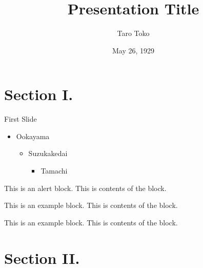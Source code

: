 \documentclass[dvipdfmx,unicode,10pt]{beamer}
\title{Presentation Title}
\author{Taro Toko}
\institute{Tokyo Institute of Technology}
\date{May 26, 1929}
\begin{document}
\begin{frame}
  \maketitle
\end{frame}

\section{Section I.}

\begin{frame}{First Slide}
  \begin{itemize}
  \item Ookayama
    \begin{itemize}
    \item Suzukakedai
      \begin{itemize}
      \item Tamachi
      \end{itemize}
    \end{itemize}
  \end{itemize}

  \begin{alertblock}{This is an alert block.}
    This is contents of the block.
  \end{alertblock}

  \begin{exampleblock}{This is an example block.}
    This is contents of the block.
  \end{exampleblock}

  \begin{block}{This is an example block.}
    This is contents of the block.
  \end{block}
\end{frame}

\section{Section II.}
\end{document}
